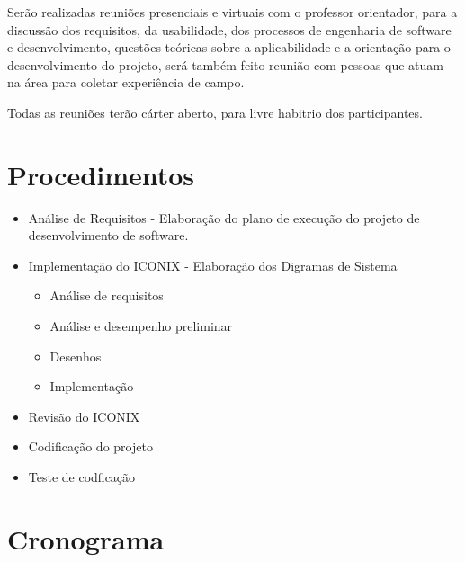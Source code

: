 \par Serão realizadas reuniões presenciais e virtuais com o professor
orientador, para a discussão dos requisitos, da usabilidade, 
dos processos de engenharia de software e desenvolvimento, questões 
teóricas sobre a aplicabilidade e a orientação para o desenvolvimento do
projeto, será também feito reunião com pessoas que atuam na área para coletar
experiência de campo.

\par Todas as reuniões terão cárter aberto, para livre habitrio dos
participantes.


\section{Procedimentos}



\begin{itemize}
  \item Análise de Requisitos - Elaboração do plano de execução do projeto de
  desenvolvimento de software.
  \item Implementação do ICONIX - Elaboração dos Digramas de Sistema
  	
  	\begin{itemize}
 	 	\item Análise de requisitos
  		\item Análise e desempenho preliminar
  		\item Desenhos
  		\item Implementação
	\end{itemize}
  	
  \item Revisão do ICONIX
  \item Codificação do projeto 
  \item Teste de codficação 
\end{itemize}



\section{Cronograma}

